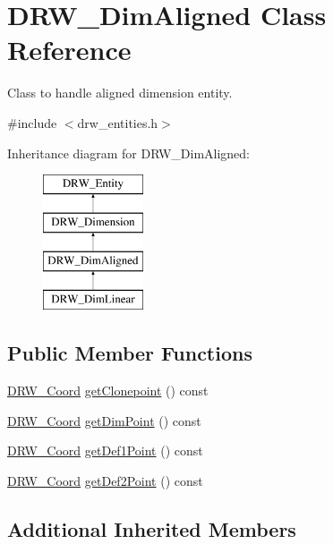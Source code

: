 \hypertarget{class_d_r_w___dim_aligned}{}\section{D\+R\+W\+\_\+\+Dim\+Aligned Class Reference}
\label{class_d_r_w___dim_aligned}


Class to handle aligned dimension entity.  




{\ttfamily \#include $<$drw\+\_\+entities.\+h$>$}

Inheritance diagram for D\+R\+W\+\_\+\+Dim\+Aligned\+:\begin{figure}[H]
\begin{center}
\leavevmode
\includegraphics[height=4.000000cm]{d2/dcb/class_d_r_w___dim_aligned}
\end{center}
\end{figure}
\subsection*{Public Member Functions}
\begin{DoxyCompactItemize}
\item 
\hyperlink{class_d_r_w___coord}{D\+R\+W\+\_\+\+Coord} \hyperlink{class_d_r_w___dim_aligned_abbd897f18dec2dcded4a6c28ac08ae69}{get\+Clonepoint} () const 
\item 
\hyperlink{class_d_r_w___coord}{D\+R\+W\+\_\+\+Coord} \hyperlink{class_d_r_w___dim_aligned_ab59c46ec3dde19b8de90ca9065bc7e89}{get\+Dim\+Point} () const 
\item 
\hyperlink{class_d_r_w___coord}{D\+R\+W\+\_\+\+Coord} \hyperlink{class_d_r_w___dim_aligned_a3e3a2f5aa773efe06e349355b9ed0b43}{get\+Def1\+Point} () const 
\item 
\hyperlink{class_d_r_w___coord}{D\+R\+W\+\_\+\+Coord} \hyperlink{class_d_r_w___dim_aligned_aef8ab998257cf7ac609b8b3783af9e03}{get\+Def2\+Point} () const 
\end{DoxyCompactItemize}
\subsection*{Additional Inherited Members}


